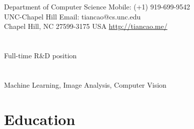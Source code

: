 \documentclass[line,margin]{res}
\begin{document}

\begin{resume}
\section{}
\smallskip
Department of Computer Science  \hfill { Mobile:}  (+1) 919-699-9542 \\
UNC-Chapel Hill \hfill { Email:}  tiancao@cs.unc.edu \\
Chapel Hill, NC 27599-3175 USA \hfill  \url{http://tiancao.me/} 

\section{}       

Full-time R\&D position

\vspace{-.05in}
\section{}       

Machine Learning, Image Analysis, Computer Vision %



\section{\sc Education}
\smallskip


\end{resume}
\end{document}
